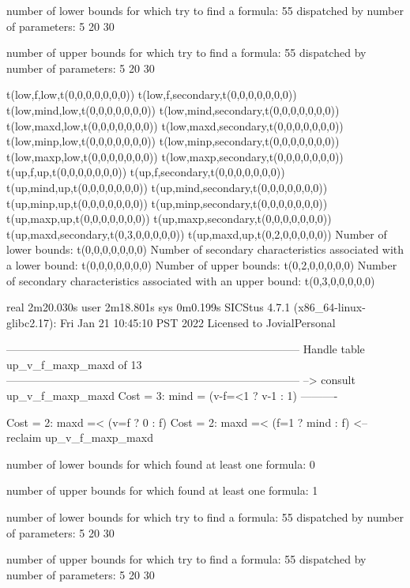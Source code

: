 number of lower bounds for which try to find a formula: 55
dispatched by number of parameters: 5  20  30

number of upper bounds for which try to find a formula: 55
dispatched by number of parameters: 5  20  30

t(low,f,low,t(0,0,0,0,0,0,0))
t(low,f,secondary,t(0,0,0,0,0,0,0))
t(low,mind,low,t(0,0,0,0,0,0,0))
t(low,mind,secondary,t(0,0,0,0,0,0,0))
t(low,maxd,low,t(0,0,0,0,0,0,0))
t(low,maxd,secondary,t(0,0,0,0,0,0,0))
t(low,minp,low,t(0,0,0,0,0,0,0))
t(low,minp,secondary,t(0,0,0,0,0,0,0))
t(low,maxp,low,t(0,0,0,0,0,0,0))
t(low,maxp,secondary,t(0,0,0,0,0,0,0))
t(up,f,up,t(0,0,0,0,0,0,0))
t(up,f,secondary,t(0,0,0,0,0,0,0))
t(up,mind,up,t(0,0,0,0,0,0,0))
t(up,mind,secondary,t(0,0,0,0,0,0,0))
t(up,minp,up,t(0,0,0,0,0,0,0))
t(up,minp,secondary,t(0,0,0,0,0,0,0))
t(up,maxp,up,t(0,0,0,0,0,0,0))
t(up,maxp,secondary,t(0,0,0,0,0,0,0))
t(up,maxd,secondary,t(0,3,0,0,0,0,0))
t(up,maxd,up,t(0,2,0,0,0,0,0))
Number of lower bounds:                                             t(0,0,0,0,0,0,0)
Number of secondary characteristics associated with a lower bound:  t(0,0,0,0,0,0,0)
Number of upper bounds:                                             t(0,2,0,0,0,0,0)
Number of secondary characteristics associated with an upper bound: t(0,3,0,0,0,0,0)

real	2m20.030s
user	2m18.801s
sys	0m0.199s
SICStus 4.7.1 (x86_64-linux-glibc2.17): Fri Jan 21 10:45:10 PST 2022
Licensed to JovialPersonal


--------------------------------------------------------------------------------
Handle table up_v_f_maxp_maxd of 13
--------------------------------------------------------------------------------
--> consult up_v_f_maxp_maxd
Cost =  3:  mind = (v-f=<1 ? v-1 : 1)
----------

Cost =  2:  maxd =< (v=f ? 0 : f)
Cost =  2:  maxd =< (f=1 ? mind : f)
<-- reclaim up_v_f_maxp_maxd

number of lower bounds for which found at least one formula: 0

number of upper bounds for which found at least one formula: 1

number of lower bounds for which try to find a formula: 55
dispatched by number of parameters: 5  20  30

number of upper bounds for which try to find a formula: 55
dispatched by number of parameters: 5  20  30

